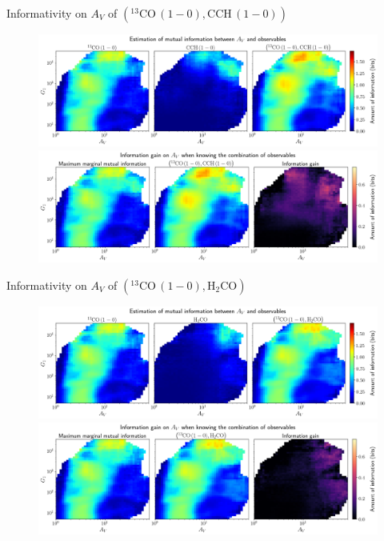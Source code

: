 \documentclass{beamer}
\begin{document}
\begin{frame}{Informativity on $A_V$ of $\left(\mathrm{^{13}CO\,(1-0)},\mathrm{CCH\,(1-0)}\right)$}
    \begin{figure}
        \centering
        \includegraphics[width=0.95\linewidth]{../mi/av__13co10_cch10_mi.png}
        \vfill
        \includegraphics[width=0.95\linewidth]{../mi/av__13co10_cch10_mi_gain.png}
    \end{figure}
\end{frame}

\begin{frame}{Informativity on $A_V$ of $\left(\mathrm{^{13}CO\,(1-0)},\mathrm{H_2CO}\right)$}
    \begin{figure}
        \centering
        \includegraphics[width=0.95\linewidth]{../mi/av__13co10_h2co_mi.png}
        \vfill
        \includegraphics[width=0.95\linewidth]{../mi/av__13co10_h2co_mi_gain.png}
    \end{figure}
\end{frame}
\end{document}
